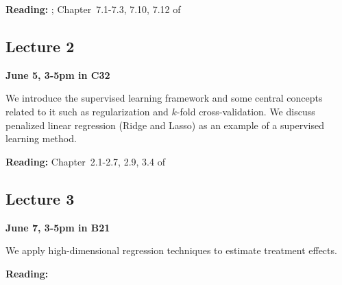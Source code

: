 \documentclass[a4paper]{scrartcl}
\begin{document}
\vspace{6pt}
\textbf{Reading:} \textcite{mullainathan2017machine}; \textcite{varian2014big}
Chapter~7.1-7.3, 7.10, 7.12 of \textcite{hastie2009elements}

\subsection*{Lecture 2}
\textbf{June 5, 3-5pm in C32}

\vspace*{6pt}\noindent
We introduce the supervised learning framework and some central concepts related to it such as regularization and $k$-fold cross-validation. We discuss penalized linear regression (Ridge and Lasso) as an example of a supervised learning method.


\vspace{10pt}
\textbf{Reading:} Chapter~2.1-2.7, 2.9, 3.4 of \textcite{hastie2009elements}


\subsection*{Lecture 3}
\textbf{June 7, 3-5pm in B21}

\vspace*{6pt}\noindent
We apply high-dimensional regression techniques to estimate treatment effects.


\vspace{10pt}
\textbf{Reading:} \textcite{belloni2014inference,belloni2017program,athey2018approximate}


\nocite{*}

\printbibliography
\end{document}
